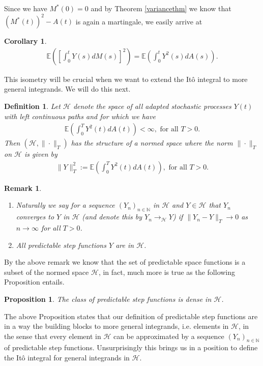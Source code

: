 \documentclass[11pt,a4paper, final]{article}
\newtheorem{prop}{Proposition}[section]
\newtheorem{cor}{Corollary}[thm]
\newtheorem{defn}{Definition}[section]
\newtheorem{rem}{Remark}[defn]
\begin{document}
\noindent Since we have $M^*(0)=0$ and by Theorem \ref{variancethm} we know that $(M^*(t))^2 -A(t)$ is again a martingale, we easily arrive at
\begin{cor} \label{corisometry} \begin{align*}
\mathbb{E} \left( \left[ \int_0^t Y(s) dM(s) \right]^2\right) = \mathbb{E} \left( \int_0^t Y^2(s) dA(s) \right).
\end{align*}
\end{cor}
\noindent This isometry will be crucial when we want to extend the Itô integral to more general integrands. We will do this next.
\newpage
\begin{defn} Let $\mathcal{H}$ denote the space of all adapted stochastic processes $Y(t)$ with left continuous paths and for which we have
\begin{align*}
\mathbb{E} \left( \int_0^T Y^2(t) dA(t) \right) < \infty, \text{ for all } T >0.
\end{align*}
Then $( \mathcal{H}, \| \cdot \|_T )$ has the structure of a normed space where the norm $\| \cdot \|_T$ on $\mathcal{H}$ is given by 
\begin{align*}
\| Y\|_T^2 := \mathbb{E} \left( \int_0^T Y^2(t) dA(t) \right), \text{ for all } T >0.
\end{align*}
\end{defn}
\begin{rem} \ \begin{enumerate}
\item Naturally we say for a sequence $(Y_n)_{n \in \mathbb{N}}$ in $\mathcal{H}$ and $Y \in \mathcal{H}$ that $Y_n$ converges to $Y$ in $\mathcal{H}$ (and denote this by $Y_n \to_\mathcal{H} Y$) if $\| Y_n - Y \|_T \to 0$ as $n \to \infty$ for all $T >0$. 
\item All predictable step functions $Y$ are in $\mathcal{H}$.
\end{enumerate}
\end{rem}
\noindent By the above remark we know that the set of predictable space functions is a subset of the normed space $\mathcal{H}$, in fact, much more is true as the following Proposition entails.
\begin{prop}
The class of predictable step functions is dense in $\mathcal{H}$.
\end{prop}
\noindent The above Proposition states that our definition of predictable step functions are in a way the building blocks to more general integrands, i.e. elements in $\mathcal{H}$, in the sense that every element in $\mathcal{H}$ can be approximated by a sequence $(Y_n)_{n \in \mathbb{N}}$ of predictable step functions.  Unsurprisingly this brings us in a position to define the Itô integral for general integrands in $\mathcal{H}$. 
\end{document}
